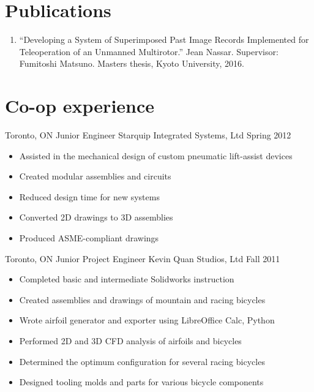 \documentclass[10pt, letterpaper]{moderncv}
\begin{document}
\section{Publications}
  \begin{enumerate}
      \item{
          ``Developing a System of Superimposed Past Image Records Implemented for Teleoperation of an Unmanned Multirotor.''
        Jean Nassar. Supervisor: Fumitoshi Matsuno.
        Masters thesis, 
        Kyoto University,
        2016.
      }
  \end{enumerate}


\section{Co-op experience}
    \begin{samepage}
      \cventry
          {Toronto, ON}
          {Junior Engineer%
}
          {%
Starquip Integrated Systems, Ltd%
}
          {Spring 2012}
        {}
        {
            \begin{itemize}
                \item{Assisted in the mechanical design of custom pneumatic lift-assist devices}
                \item{Created modular assemblies and circuits}
                \item{Reduced design time for new systems}
                \item{Converted 2D drawings to 3D assemblies}
                \item{Produced ASME-compliant drawings}
            \end{itemize}
        }
    \end{samepage}
    \begin{samepage}
      \cventry
          {Toronto, ON}
          {Junior Project Engineer%
}
          {%
Kevin Quan Studios, Ltd%
}
          {Fall 2011}
        {}
        {
            \begin{itemize}
                \item{Completed basic and intermediate Solidworks instruction}
                \item{Created assemblies and drawings of mountain and racing bicycles}
                \item{Wrote airfoil generator and exporter using LibreOffice Calc, Python}
                \item{Performed 2D and 3D CFD analysis of airfoils and bicycles}
                \item{Determined the optimum configuration for several racing bicycles}
                \item{Designed tooling molds and parts for various bicycle components}
            \end{itemize}
        }
    \end{samepage}
\end{document}
